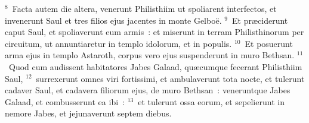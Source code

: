${}^{8}$~Facta autem die altera, venerunt Philisthiim ut spoliarent interfectos, et invenerunt Saul et tres filios ejus jacentes in monte Gelbo\"e.
${}^{9}$~Et pr\ae ciderunt caput Saul, et spoliaverunt eum armis~: et miserunt in terram Philisthinorum per circuitum, ut annuntiaretur in templo idolorum, et in populis.
${}^{10}$~Et posuerunt arma ejus in templo Astaroth, corpus vero ejus suspenderunt in muro Bethsan.
${}^{11}$~Quod cum audissent habitatores Jabes Galaad, qu\ae cumque fecerant Philisthiim Saul,
${}^{12}$~surrexerunt omnes viri fortissimi, et ambulaverunt tota nocte, et tulerunt cadaver Saul, et cadavera filiorum ejus, de muro Bethsan~: veneruntque Jabes Galaad, et combusserunt ea ibi~:
${}^{13}$~et tulerunt ossa eorum, et sepelierunt in nemore Jabes, et jejunaverunt septem diebus.
